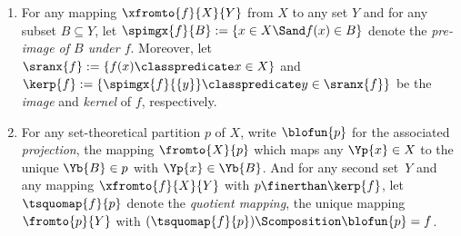 \documentclass[pdftex]{sigma}
\numberwithin{equation}{section}
\begin{document}
\begin{Notation}
\begin{enumerate}
    {
      \newcommand{\smallpart}{p}
      \newcommand{\largepart}{q}
      \newcommand{\smallblock}{\Yb{B}}
      \newcommand{\largeblock}{\Yb{C}}
      \newcommand{\leftpartition}{p_1}
      \newcommand{\rightpartition}{p_2}
      \newcommand{\thejoin}{s}
      \newcommand{\thepartition}{p}
      \newcommand{\anyel}{\Yp{x}}
      \newcommand{\block}{\Yb{B}}
      Furthermore, for any set-theo\-re\-ti\-cal partitions $\leftpartition$ and $\rightpartition$ of $\theset$ the \emph{join} of $\leftpartition$ and $\rightpartition$ is the unique  set-theo\-re\-ti\-cal partition $\thejoin$ of $\theset$ which satisfies $\leftpartition\finerthan\thejoin$ and $\rightpartition\finerthan\thejoin$ and which is minimal with that property with respect to the partial order $\finerthanrel$.
    }
    \item\label{notation:set-theoretical-partitions-5}
    {
      \newcommand{\themap}{f}
      \newcommand{\domset}{X}
      \newcommand{\codset}{Y}
      \newcommand{\domsubset}{A}
      \newcommand{\codsubset}{B}
      \newcommand{\domel}{x}
      \newcommand{\codel}{y}
      For any mapping $\xfromto{\themap}{\domset}{\codset}$ from $\domset$ to any set $\codset$ and for any subset $\codsubset\subseteq \codset$, let $\spimgx{\themap}{\codsubset}:= \{\domel\in\domset\Sand \themap(\domel)\in\codsubset\}$ denote the \emph{pre-image of $\codsubset$ under $\themap$}. Moreover, let $\sranx{\themap}:= \{\themap(\domel)\classpredicate \domel\in\domset\}$ and $\kerp{\themap}:= \{\spimgx{\themap}{\{\codel\}}\classpredicate \codel\in\sranx{\themap}\}$ be the \emph{image} and \emph{kernel} of $\themap$, respectively.
    }
  \item\label{notation:set-theoretical-partitions-6}
    {
      \newcommand{\themap}{f}
      \newcommand{\domset}{X}
      \newcommand{\codset}{Y}
      \newcommand{\anyel}{\Yp{x}}
      \newcommand{\thepartition}{p}
      \newcommand{\block}{\Yb{B}}
      For any set-theo\-re\-ti\-cal partition  $\thepartition$ of $\domset$, write $\blofun{\thepartition}$ for the associated \emph{projection}, the mapping $\fromto{\domset}{\thepartition}$ which maps any  $\anyel\in\domset$ to the unique $\block\in\thepartition$ with $\anyel\in\block$. And for any second set~$\codset$ and any mapping $\xfromto{\themap}{\domset}{\codset}$ with $\thepartition\finerthan\kerp{\themap}$, let $\tsquomap{\themap}{\thepartition}$ denote the \emph{quotient mapping}, the unique mapping $\fromto{\thepartition}{\codset}$ with $(\tsquomap{\themap}{\thepartition})\Scomposition \blofun{\thepartition}=\themap$.
    }
  \end{enumerate}
\end{Notation}
\end{document}
